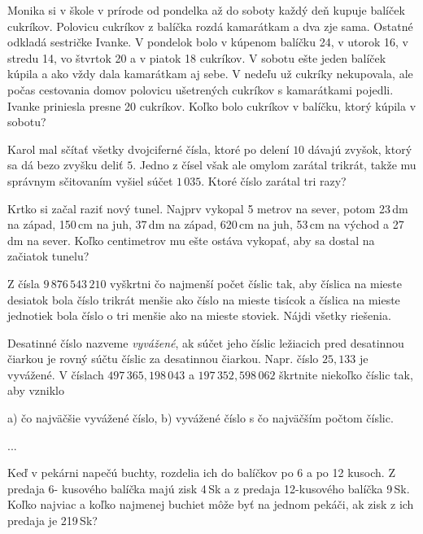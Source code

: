 {%
Monika si v škole v prírode od pondelka až do soboty každý deň kupuje balíček cukríkov.
Polovicu cukríkov z balíčka rozdá kamarátkam a dva zje sama. Ostatné odkladá sestričke
Ivanke. V pondelok bolo v kúpenom balíčku 24, v utorok 16, v stredu 14, vo štvrtok 20
a v piatok 18 cukríkov. V sobotu ešte jeden balíček kúpila a ako vždy dala kamarátkam aj
sebe. V nedeľu už cukríky nekupovala, ale počas cestovania domov polovicu ušetrených
cukríkov s kamarátkami pojedli. Ivanke priniesla presne 20 cukríkov. Koľko bolo cukríkov
v balíčku, ktorý kúpila v sobotu?}

{%
Karol mal sčítať všetky dvojciferné čísla, ktoré po delení $10$ dávajú zvyšok, ktorý sa dá bezo
zvyšku deliť $5$. Jedno z čísel však ale omylom zarátal trikrát, takže mu správnym sčitovaním
vyšiel súčet $1\,035$. Ktoré číslo zarátal tri razy?}

{%
Krtko si začal raziť nový tunel. Najprv vykopal 5 metrov na sever, potom 23\,dm na západ,
150\,cm na juh, 37\,dm na západ, 620\,cm na juh, 53\,cm na východ a 27\,dm na sever. Koľko
centimetrov mu ešte ostáva vykopať, aby sa dostal na začiatok tunelu?}

{%
Z čísla $9\,876\,543\,210$ vyškrtni čo najmenší počet číslic tak, aby číslica na mieste desiatok bola
číslo trikrát menšie ako číslo na mieste tisícok a číslica na mieste jednotiek bola číslo o tri
menšie ako na mieste stoviek. Nájdi všetky riešenia.}

{%
Desatinné číslo nazveme {\it vyvážené}, ak súčet jeho číslic ležiacich pred desatinnou čiarkou je
rovný súčtu číslic za desatinnou čiarkou. Napr. číslo $25{,}133$ je vyvážené.
V číslach $497\,365{,}198\,043$ a $197\,352{,}598\,062$ škrtnite niekoľko číslic tak, aby vzniklo
\begin{itemize}
\ite a) čo najväčšie vyvážené číslo,
\ite b) vyvážené číslo s čo najväčším počtom číslic.
\end{itemize}
}

{%
...}

{%
Keď v pekárni napečú buchty, rozdelia ich do balíčkov po 6 a po 12 kusoch. Z predaja 6-
kusového balíčka majú zisk 4\,Sk a z predaja 12-kusového balíčka 9\,Sk. Koľko najviac a koľko
najmenej buchiet môže byť na jednom pekáči, ak zisk z ich predaja je 219\,Sk?}

